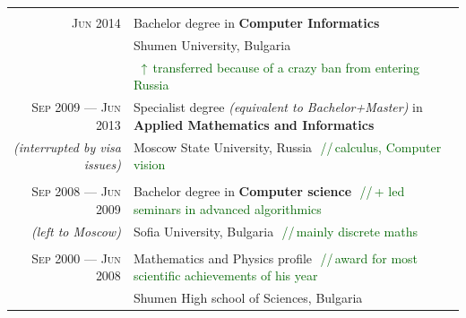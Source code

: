 \documentclass[a4paper,10pt]{article}
\def\myline{\color{linegray}\vline}
\newcommand{\minorcolor}[1]{\textcolor{mygray}{#1}}
\newcommand{\comment}[1]{\small\textcolor{darkgreen}{\,\,//\,#1}}
\newcommand{\mydate}[1]{\minorcolor{\textsc{#1}}}
\newcommand{\bracketcomment}[1]{{\small\textit{\minorcolor{(#1)}}}}
\begin{document}
{\begin{tabular}{r!{\myline}p{14cm}}
        \\
        \mydate{Jun 2014}                   &   Bachelor degree in \textbf{Computer Informatics}\\
                                            &   Shumen University, Bulgaria\\
                                            &   \small\textcolor{darkgreen}{\,\,$\uparrow$\,transferred because of a crazy ban from entering Russia}\\
        \mydate{Sep 2009 --- Jun 2013}      &   Specialist degree \bracketcomment{equivalent to Bachelor+Master} in \textbf{Applied Mathematics and Informatics}\\
        \bracketcomment{interrupted by visa issues}
                                            &   Moscow State University, Russia \comment{calculus, Computer vision}\\



        \\
        \mydate{Sep 2008 --- Jun 2009}      &   Bachelor degree in \textbf{Computer science}
                                                \comment{+ led seminars in advanced algorithmics}\\
        \bracketcomment{left to Moscow} &  Sofia University, Bulgaria \comment{mainly discrete maths}\\

       \\
        \mydate{Sep 2000 --- Jun 2008}      &   Mathematics and Physics profile
                                                \comment{award for most scientific achievements of his year}\\
                                            &   Shumen High school of Sciences, Bulgaria\\
\end{tabular}
}  %
\par\smallskip
\end{document}
